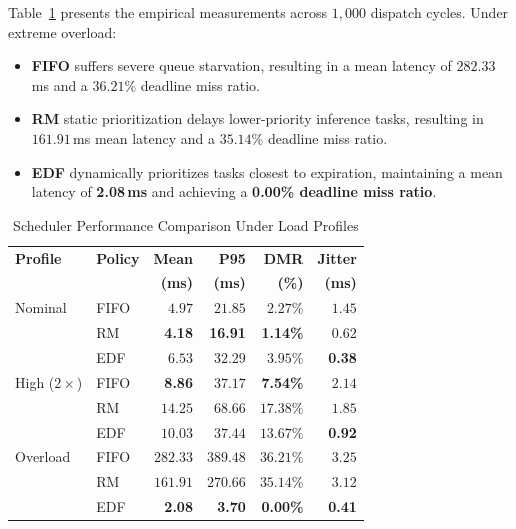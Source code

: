 \documentclass[10pt,twocolumn,letterpaper]{article}
\begin{document}
Table~\ref{tab:scheduler_workload_benchmark} presents the empirical measurements across $1{,}000$ dispatch cycles. Under extreme overload:
\begin{itemize}
    \item \textbf{FIFO} suffers severe queue starvation, resulting in a mean latency of $282.33$\,ms and a $36.21\%$ deadline miss ratio.
    \item \textbf{RM} static prioritization delays lower-priority inference tasks, resulting in $161.91$\,ms mean latency and a $35.14\%$ deadline miss ratio.
    \item \textbf{EDF} dynamically prioritizes tasks closest to expiration, maintaining a mean latency of \textbf{2.08\,ms} and achieving a \textbf{0.00\% deadline miss ratio}.
\end{itemize}

\begin{table}[htbp]
\centering
\footnotesize
\setlength{\tabcolsep}{2pt}
\caption{Scheduler Performance Comparison Under Load Profiles}
\label{tab:scheduler_workload_benchmark}
\begin{tabular*}{\columnwidth}{@{\extracolsep{\fill}}llrrrr}
\toprule
\textbf{Profile} & \textbf{Policy} & \textbf{Mean} & \textbf{P95} & \textbf{DMR} & \textbf{Jitter} \\
 & & \textbf{(ms)} & \textbf{(ms)} & \textbf{(\%)} & \textbf{(ms)} \\
\midrule
Nominal & FIFO & $4.97$ & $21.85$ & $2.27\%$ & $1.45$ \\
        & RM   & \textbf{4.18} & \textbf{16.91} & \textbf{1.14\%} & $0.62$ \\
        & EDF  & $6.53$ & $32.29$ & $3.95\%$ & \textbf{0.38} \\
\midrule
High ($2\times$) & FIFO & \textbf{8.86} & $37.17$ & \textbf{7.54\%} & $2.14$ \\
                 & RM   & $14.25$ & $68.66$ & $17.38\%$ & $1.85$ \\
                 & EDF  & $10.03$ & $37.44$ & $13.67\%$ & \textbf{0.92} \\
\midrule
Overload & FIFO & $282.33$ & $389.48$ & $36.21\%$ & $3.25$ \\
         & RM   & $161.91$ & $270.66$ & $35.14\%$ & $3.12$ \\
         & EDF  & \textbf{2.08} & \textbf{3.70} & \textbf{0.00\%} & \textbf{0.41} \\
\bottomrule
\end{tabular*}
\end{table}
\end{document}
